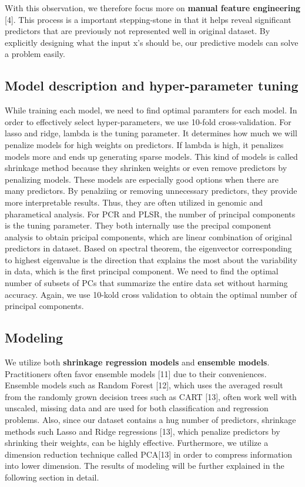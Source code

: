 \documentclass[a4paper]{article}
\begin{document}
\begin{flushleft}
With this observation, we therefore focus more on \textbf{manual feature engineering} [4]. This process is a important stepping-stone in that it helps reveal significant predictors that are previously not represented well in original dataset. By explicitly designing what the input x's should be, our predictive models can solve a problem easily. \newline

\subsection{Model description and hyper-parameter tuning}
While training each model, we need to find optimal paramters for each model. In order to effectively select hyper-parameters, we use 10-fold cross-validation. For lasso and ridge, lambda is the tuning parameter. It determines how much we will penalize models for high weights on predictors. If lambda is high, it penalizes models more and ends up generating sparse models. This kind of models is called shrinkage method because they shrinken weights or even remove predictors by penalizing models. These models are especially good options when there are many predictors. By penalziing or removing unnecessary predictors, they provide more interpretable results. Thus, they are often utilized in genomic and pharametical analysis. For PCR and PLSR, the number of principal components is the tuning parameter. They both internally use the precipal component analysis to obtain pricipal components, which are linear combination of original predictors in dataset. Based on spectral theorem, the eigenvector corresponding to highest eigenvalue is the direction that explains the most about the variability in data, which is the first principal component. We need to find the optimal number of subsets of PCs that summarize the entire data set without harming accuracy. Again, we use 10-kold cross validation to obtain the optimal number of principal components.

\subsection{Modeling}
We utilize both \textbf{shrinkage regression models} and \textbf{ensemble models}. Practitioners often favor ensemble models [11] due to their conveniences. Ensemble models such as Random Forest [12], which uses the averaged result from the randomly grown decision trees such as CART [13], often work well with unscaled, missing data and are used for both classification and regression problems. Also, since our dataset contains a hug number of predictors, shrinkage methods such Lasso and Ridge regressions [13], which penalize predictors by shrinking their weights, can be highly effective. Furthermore, we utilize a dimension reduction technique called PCA[13] in order to compress information into lower dimension. The results of modeling will be further explained in the following section in detail.


\end{flushleft}
\end{document}
